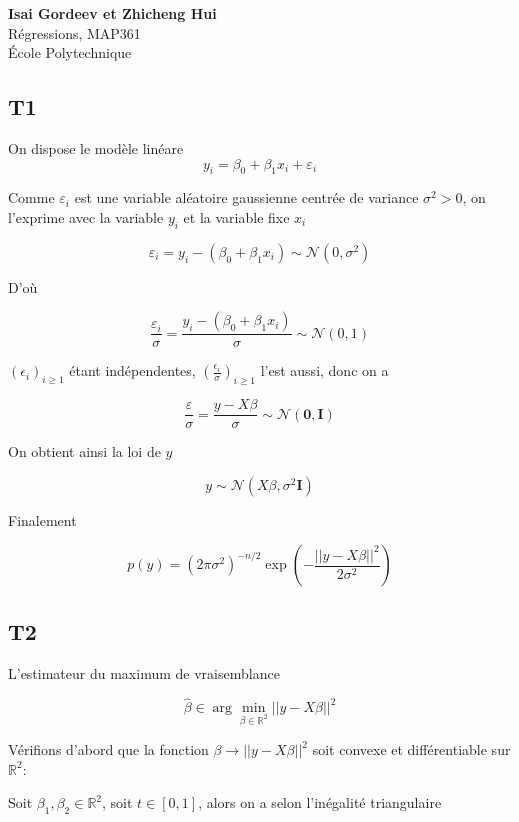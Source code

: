 \documentclass[a4paper,12pt]{article}
\begin{document}
	\begin{center}
		\textbf{Isai Gordeev et Zhicheng Hui}\\
		Régressions, MAP361\\
		École Polytechnique\\

	\end{center}
	
\subsection*{T1}

On dispose le modèle linéare
$$ y_i = \beta_0 + \beta_1x_i+\varepsilon_i $$

Comme $\varepsilon_i$ est une variable aléatoire gaussienne centrée de variance $\sigma^2 > 0$, on l'exprime avec la variable $y_i$ et la variable fixe $x_i$

$$ \varepsilon_i = y_i - \left(\beta_0 + \beta_1x_i\right) \sim \mathcal{N}(0, \sigma^2)$$

D'où

$$ \frac{\varepsilon_i}{\sigma} = \frac{y_i - \left(\beta_0 + \beta_1x_i\right)}{\sigma} \sim \mathcal{N}(0, 1)$$

$(\epsilon_i)_{i \ge 1}$ étant indépendentes, $(\frac{\epsilon_i}{\sigma})_{i \ge 1}$ l'est aussi, donc on a

$$ \frac{\varepsilon}{\sigma} = \frac{y - X\beta}{\sigma} \sim \mathcal{N}(\pmb{0}, \pmb{I})$$

On obtient ainsi la loi de $y$

$$ y \sim \mathcal{N}(X\beta, \sigma^2\pmb{I}) $$

Finalement

$$ p(y) = (2\pi\sigma^2)^{-n/2}\displaystyle\exp\left(-\frac{||y - X\beta||^2}{2\sigma^2}\right)$$

\subsection*{T2}


L'estimateur du maximum de vraisemblance

$$ \hat\beta \in \arg \min_{\beta\in\mathbb{R}^2}||y - X\beta||^2 $$

Vérifions d'abord que la fonction $\beta \rightarrow ||y - X\beta||^2$ soit convexe et différentiable sur $\mathbb{R}^2$:

Soit $\beta_1, \beta_2 \in \mathbb{R}^2$, soit $t \in [0, 1]$, alors on a selon l'inégalité triangulaire
\end{document}
